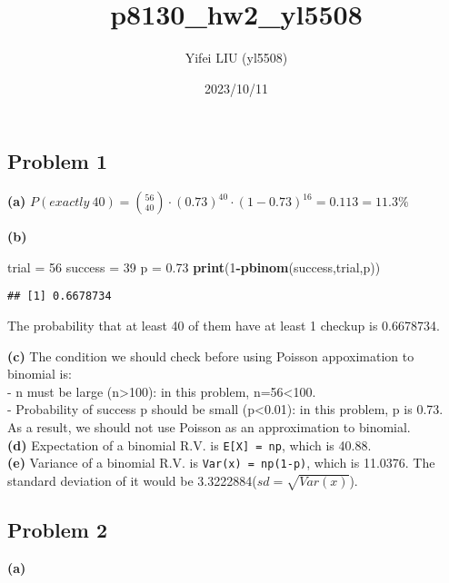 \documentclass[
]{article}
\title{p8130\_hw2\_yl5508}
\author{Yifei LIU (yl5508)}
\date{2023/10/11}
\newenvironment{Shaded}{\begin{snugshade}}{\end{snugshade}}
\newcommand{\DecValTok}[1]{\textcolor[rgb]{0.00,0.00,0.81}{#1}}
\newcommand{\FloatTok}[1]{\textcolor[rgb]{0.00,0.00,0.81}{#1}}
\newcommand{\FunctionTok}[1]{\textcolor[rgb]{0.13,0.29,0.53}{\textbf{#1}}}
\newcommand{\NormalTok}[1]{#1}
\newcommand{\OtherTok}[1]{\textcolor[rgb]{0.56,0.35,0.01}{#1}}
\newcommand{\SpecialCharTok}[1]{\textcolor[rgb]{0.81,0.36,0.00}{\textbf{#1}}}
\begin{document}
\maketitle

\hypertarget{problem-1}{%
\subsection{Problem 1}\label{problem-1}}

\textbf{(a)}
\(P(exactly\ 40)=\binom{56}{40} \cdot (0.73)^{40} \cdot (1 - 0.73)^{16}=0.113=11.3\%\)

\textbf{(b)}

\begin{Shaded}
\begin{Highlighting}[]
\NormalTok{trial }\OtherTok{=} \DecValTok{56}
\NormalTok{success }\OtherTok{=} \DecValTok{39}
\NormalTok{p }\OtherTok{=} \FloatTok{0.73}
\FunctionTok{print}\NormalTok{(}\DecValTok{1}\SpecialCharTok{{-}}\FunctionTok{pbinom}\NormalTok{(success,trial,p))}
\end{Highlighting}
\end{Shaded}

\begin{verbatim}
## [1] 0.6678734
\end{verbatim}

The probability that at least 40 of them have at least 1 checkup is
0.6678734.

\textbf{(c)} The condition we should check before using Poisson
appoximation to binomial is:\\
- n must be large (n\textgreater100): in this problem,
n=56\textless100.\\
- Probability of success p should be small (p\textless0.01): in this
problem, p is 0.73.\\
As a result, we should not use Poisson as an approximation to
binomial.\\
\textbf{(d)} Expectation of a binomial R.V. is \texttt{E{[}X{]}\ =\ np},
which is 40.88.\\
\textbf{(e)} Variance of a binomial R.V. is \texttt{Var(x)\ =\ np(1-p)},
which is 11.0376. The standard deviation of it would be
3.3222884(\(sd=\sqrt{Var(x)}\)).

\hypertarget{problem-2}{%
\subsection{Problem 2}\label{problem-2}}

\textbf{(a)}
\end{document}
